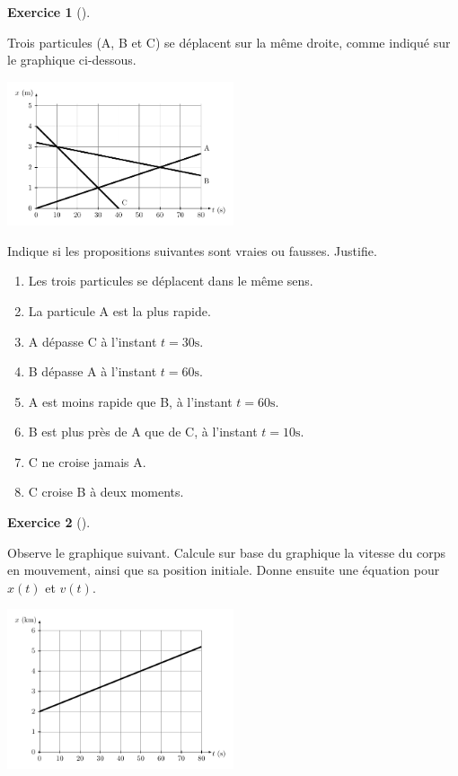 \documentclass[
  a4paper,
  DIV=11,
  numbers=noendperiod,
  sans]{scrartcl}
\providecommand{\tightlist}{%
  \setlength{\itemsep}{0pt}\setlength{\parskip}{0pt}}\usepackage{longtable,booktabs,array}
\theoremstyle{definition}
\newtheorem{exercise}{Exercice}[section]
\theoremstyle{definition}
\theoremstyle{remark}
\begin{document}
\begin{exercise}[]\protect\hypertarget{exr-croisement}{}\label{exr-croisement}

Trois particules (A, B et C) se déplacent sur la même droite, comme
indiqué sur le graphique ci-dessous.

\begin{center}
\includegraphics[width=0.5\textwidth,height=\textheight]{figures/mru/fig11.pdf}
\end{center}

Indique si les propositions suivantes sont vraies ou fausses. Justifie.

\begin{enumerate}
\def\labelenumi{\arabic{enumi}.}
\tightlist
\item
  Les trois particules se déplacent dans le même sens.
\item
  La particule A est la plus rapide.
\item
  A dépasse C à l'instant \(t=30\text{s}\).
\item
  B dépasse A à l'instant \(t=60\text{s}\).
\item
  A est moins rapide que B, à l'instant \(t=60\text{s}\).
\item
  B est plus près de A que de C, à l'instant \(t=10\text{s}\).
\item
  C ne croise jamais A.
\item
  C croise B à deux moments.
\end{enumerate}

\end{exercise}

\begin{exercise}[]\protect\hypertarget{exr-calcul-2}{}\label{exr-calcul-2}

Observe le graphique suivant. Calcule sur base du graphique la vitesse
du corps en mouvement, ainsi que sa position initiale. Donne ensuite une
équation pour \(x(t)\) et \(v(t)\).

\begin{center}
\includegraphics[width=0.5\textwidth,height=\textheight]{figures/mru/fig12.pdf}
\end{center}

\end{exercise}
\end{document}
